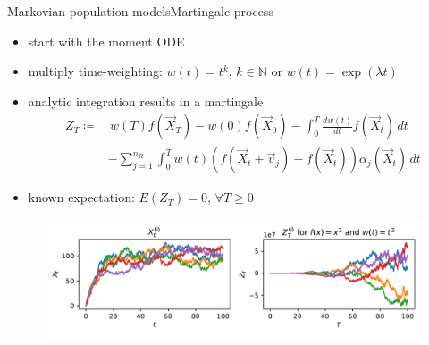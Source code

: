 \documentclass[9pt]{beamer}
\newcommand{\expSym}{{E}}
\newcommand{\E}[1]{\ensuremath{\expSym\left(#1\right)}}
\begin{document}
\begin{frame}{Markovian population models}{Martingale process}
    \begin{itemize}
        \item start with the moment ODE
    \item multiply time-weighting: $w(t)=t^k$, $k\in\mathbb{N}$ or $w(t)=\exp(\lambda t)$
    \item analytic integration results in a martingale 
        \begin{equation*}
            \begin{split}
            Z_T\coloneqq&\,w(T)f(\vec X_T) - w(0)f(\vec X_{0}) -
            \int_{0}^T\frac{dw(t)}{dt}f(\vec X_t)\,dt\\
            &-\sum_{j=1}^{n_R}\int_{0}^Tw(t)
                 (f(\vec X_t+\vec v_j) - f(\vec X_t))\alpha_j(\vec X_t)\,dt
         \end{split}
        \end{equation*}
    \item known expectation: $\E{Z_T}=0$, $\forall T\geq 0$
  \end{itemize}
    \begin{example}
    \vspace{-1em}
    \begin{figure}
        \includegraphics[scale=.5]{../gfx/martingales.pdf}
    \end{figure}
    \vspace{-1em}
    \end{example}
\end{frame}
\end{document}
